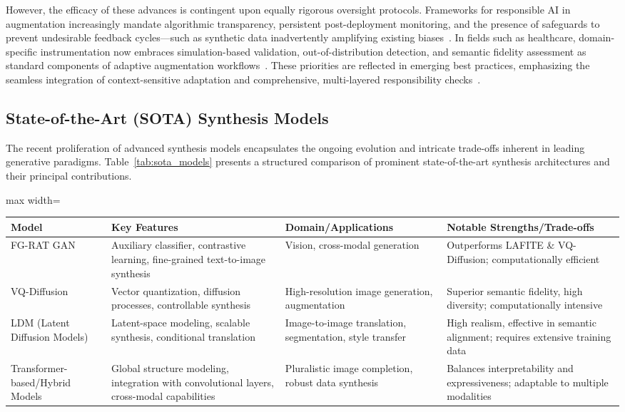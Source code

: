 \documentclass[sigconf]{acmart}
\begin{document}
However, the efficacy of these advances is contingent upon equally rigorous oversight protocols. Frameworks for responsible AI in augmentation increasingly mandate algorithmic transparency, persistent post-deployment monitoring, and the presence of safeguards to prevent undesirable feedback cycles---such as synthetic data inadvertently amplifying existing biases~\cite{ref94,ref95,ref101}. In fields such as healthcare, domain-specific instrumentation now embraces simulation-based validation, out-of-distribution detection, and semantic fidelity assessment as standard components of adaptive augmentation workflows~\cite{ref87,ref101}. These priorities are reflected in emerging best practices, emphasizing the seamless integration of context-sensitive adaptation and comprehensive, multi-layered responsibility checks~\cite{ref94,ref95,ref101}.

\subsection{State-of-the-Art (SOTA) Synthesis Models}

The recent proliferation of advanced synthesis models encapsulates the ongoing evolution and intricate trade-offs inherent in leading generative paradigms. Table~\ref{tab:sota_models} presents a structured comparison of prominent state-of-the-art synthesis architectures and their principal contributions.

\begin{table*}[htbp]
\centering
\caption{Comparison of Select State-of-the-Art Generative Synthesis Models}
\label{tab:sota_models}
\begin{adjustbox}{max width=\textwidth}
\begin{tabular}{llll}
\toprule
\textbf{Model} & \textbf{Key Features} & \textbf{Domain/Applications} & \textbf{Notable Strengths/Trade-offs} \\
\midrule
FG-RAT GAN~\cite{ref87} & Auxiliary classifier, contrastive learning, fine-grained text-to-image synthesis & Vision, cross-modal generation & Outperforms LAFITE \& VQ-Diffusion; computationally efficient \\
VQ-Diffusion~\cite{ref82,ref87} & Vector quantization, diffusion processes, controllable synthesis & High-resolution image generation, augmentation & Superior semantic fidelity, high diversity; computationally intensive \\
LDM (Latent Diffusion Models)~\cite{ref82,ref101} & Latent-space modeling, scalable synthesis, conditional translation & Image-to-image translation, segmentation, style transfer & High realism, effective in semantic alignment; requires extensive training data \\
Transformer-based/Hybrid Models~\cite{ref64,ref81,ref102} & Global structure modeling, integration with convolutional layers, cross-modal capabilities & Pluralistic image completion, robust data synthesis & Balances interpretability and expressiveness; adaptable to multiple modalities \\
\bottomrule
\end{tabular}
\end{adjustbox}
\end{table*}
\end{document}
